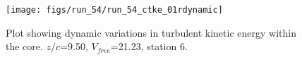 \begin{figure}[H]
\centering
\texttt{[image: figs/run\_54/run\_54\_ctke\_01rdynamic]}
\caption{Plot showing dynamic variations in turbulent kinetic energy within the core. $z/c$=9.50, $V_{free}$=21.23, station 6.}
\end{figure}


